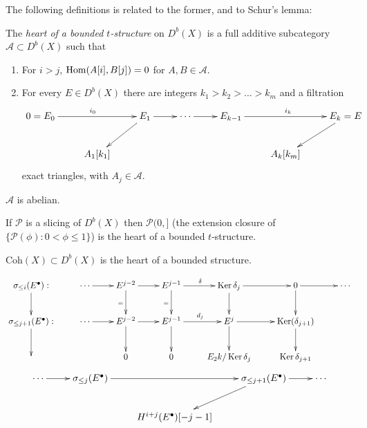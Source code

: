 The following definitions is related to the former, and to Schur's lemma:

\begin{definition}
\label{definition-heart-of-bounded-t-structure}
The {\it heart of a bounded $t$-structure} on $D^b(X)$ is a full additive
subcategory $\mathcal{A} \subset D^b(X)$ such that
\begin{enumerate}
\item For $i>j$, $\mathop{\mathrm{Hom}}\nolimits(A[i],B[j])=0$ for $A,B \in \mathcal{A}$.
\item For every $E \in D^b(X)$ there are integers $k_1>k_2>\ldots>k_m$ and a
filtration
\begin{equation}
\label{equation-diagram-abelian-category}
\xymatrix{
0=E_0\ar[rr]^{i_0}&&E_1\ar[dl]\ar[r]&\cdots\ar[r]
&E_{k-1}\ar[rr]^{i_k}&&E_k=E\ar[dl]\\
&A_1[k_1]& & & & A_k[k_m]
}
\end{equation}
exact triangles, with $A_j \in \mathcal{A}$.
\end{enumerate}
\end{definition}

\begin{exercise}
\label{exercise-A-is-abelian}
$\mathcal{A}$ is abelian.
\end{exercise}

\begin{exercise}
\label{exercise-}
If $\mathcal{P}$ is a slicing of $D^b(X)$ then $\mathcal{P}(0,]$ (the extension
closure of $\{\mathcal{P}(\phi):0<\phi \leq 1\}$) is the heart of a bounded
$t$-structure.
\end{exercise}

\begin{example}
\label{example-coherent-sheaves-are-the-heart-of-a-bounded-structure}
$\text{Coh}(X)\subset D^b(X)$ is the heart of a bounded structure.

$$
\xymatrix{
\sigma_{\leq i}(E^\bullet):\ar[d]& \cdots\ar[r]& E^{j-2}\ar[d]_=\ar[r]& 
E^{j-1}\ar[d]_=\ar[r]^{\delta}& \Ker \delta_j\ar[d]\ar[r]&  0 \ar[d]\ar[r]
&  \cdots\\
\sigma_{\leq j+1}(E^\bullet):\ar[d]&  \cdots \ar[r]& E^{j-2}\ar[d]\ar[r]
& E^{j-1}\ar[d]\ar[r]^{d_j}&E^j\ar[d]\ar[r]& \Ker(\delta_{j+1})\ar[d]\\
&& 0& 0&E_2k/\Ker \delta_j& \Ker \delta_{j+1}
}
$$
\medskip
$$
\xymatrix{
\cdots\ar[r]&\sigma_{\leq j}(E^\bullet)\ar[rr]& &\sigma_{\leq
j+1}(E^\bullet)\ar[dl]\ar[r]&  \cdots\\
&  &  H^{i+j}(E^\bullet)[-j-1]
}
$$
\end{example}

